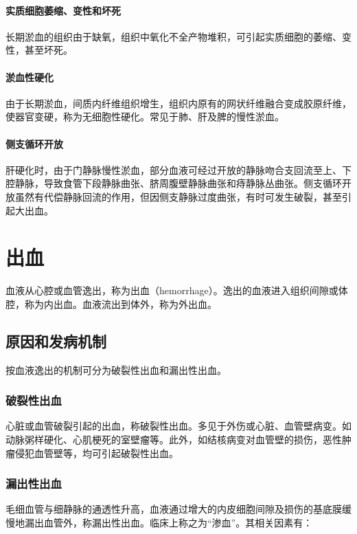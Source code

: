 \paragraph{实质细胞萎缩、变性和坏死}
长期淤血的组织由于缺氧，组织中氧化不全产物堆积，可引起实质细胞的萎缩、变性，甚至坏死。

\paragraph{淤血性硬化}
由于长期淤血，间质内纤维组织增生，组织内原有的网状纤维融合变成胶原纤维，使器官变硬，称为无细胞性硬化。常见于肺、肝及脾的慢性淤血。

\paragraph{侧支循环开放}
肝硬化时，由于门静脉慢性淤血，部分血液可经过开放的静脉吻合支回流至上、下腔静脉，导致食管下段静脉曲张、脐周腹壁静脉曲张和痔静脉丛曲张。侧支循环开放虽然有代偿静脉回流的作用，但因侧支静脉过度曲张，有时可发生破裂，甚至引起大出血。

\section{出血}

血液从心腔或血管逸出，称为出血（hemorrhage）。逸出的血液进入组织间隙或体腔，称为内出血。血液流出到体外，称为外出血。

\subsection{原因和发病机制}

按血液逸出的机制可分为破裂性出血和漏出性出血。

\subsubsection{破裂性出血}

心脏或血管破裂引起的出血，称破裂性出血。多见于外伤或心脏、血管壁病变。如动脉粥样硬化、心肌梗死的室壁瘤等。此外，如结核病变对血管壁的损伤，恶性肿瘤侵犯血管壁等，均可引起破裂性出血。

\subsubsection{漏出性出血}

毛细血管与细静脉的通透性升高，血液通过增大的内皮细胞间隙及损伤的基底膜缓慢地漏出血管外，称漏出性出血。临床上称之为``渗血''。其相关因素有：

